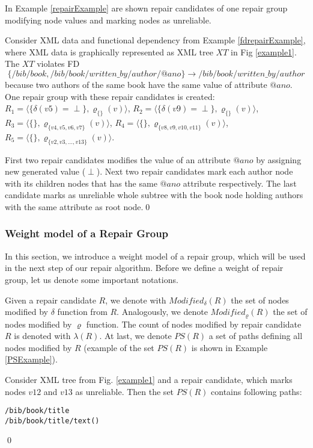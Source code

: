 In Example \ref{repairExample} are shown repair candidates of one repair group modifying node values and marking nodes as unreliable.

\begin{example}\label{repairExample}
Consider XML data and functional dependency from Example \ref{fdrepairExample}, where XML data is graphically represented as XML tree $XT$ in Fig \ref{example1}. The $XT$ violates FD $$\{/bib/book, /bib/book/written\_by/author/@ano\} \rightarrow /bib/book/written\_by/author$$ because two authors of the same book have the same value of attribute $@ano$. One repair group with these repair candidates is created: $R_1 = \langle \{\delta(v5) = \perp\},\varrho_{\{\}}(v) \rangle$, $R_2 = \langle \{\delta(v9) = \perp\},\varrho_{\{\}}(v) \rangle$, $R_3 = \langle \{\},\varrho_{\{v4,v5,v6,v7\}}(v) \rangle$, $R_4 = \langle \{\},\varrho_{\{v8,v9,v10,v11\}}(v) \rangle$, $R_5 = \langle \{\},\varrho_{\{v2,v3,\dots,v13\}}(v) \rangle$.

First two repair candidates modifies the value of an attribute $@ano$ by assigning new generated value ($\perp$). Next two repair candidates mark each author node with its children nodes that has the same $@ano$ attribute respectively. The last candidate marks as unreliable whole subtree with the book node holding authors with the same attribute as root node.\qed
\end{example}

\subsubsection{Weight model of a Repair Group}

In this section, we introduce a weight model of a repair group, which will be used in the next step of our repair algorithm. Before we define a weight of repair group, let us denote some important notations.

Given a repair candidate $R$, we denote with $Modified_\delta(R)$ the set of nodes modified by $\delta$ function from $R$. Analogously, we denote $Modified_\varrho(R)$ the set of nodes modified by $\varrho$ function. The count of nodes modified by repair candidate $R$ is denoted with $\lambda(R)$. At last, we denote $PS(R)$ a set of paths defining all nodes modified by $R$ (example of the set $PS(R)$ is shown in Example \ref{PSExample}).

\begin{example}\label{PSExample}
Consider XML tree from Fig. \ref{example1} and a repair candidate, which marks nodes $v12$ and $v13$ as unreliable. Then the set $PS(R)$ contains following paths:
\begin{verbatim}
/bib/book/title
/bib/book/title/text()
\end{verbatim}\qed
\end{example}


